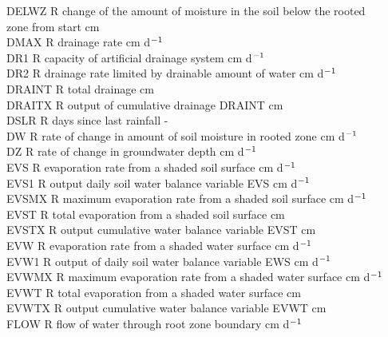 \documentclass[11pt]{article}
\begin{document}
\begin{tabbing}
DELWZ\> \> R\> change of the amount of moisture in the soil below the rooted \\
\>\> \> zone from start\> \> \> \> \> \> \> cm\\
DMAX\> \> R\> drainage rate\> \> \> \> \> \> \> cm d$^{{\rm -1}}$\\
DR1\> \> R\> capacity of artificial drainage system\> \> \> \> \> \> \> cm d$^{{\rm -1}}$\\
DR2\> \> R\> drainage rate limited by drainable amount of water\> \> \> \> \> \> \> cm d$^{{\rm -1}}$\\
DRAINT\> \> R\> total drainage\> \> \> \> \> \> \> cm\\
DRAITX\> \> R\> output of cumulative drainage DRAINT\> \> \> \> \> \> \> cm\\
DSLR\> \> R\> days since last rainfall\> \> \> \> \> \> \> -\\
DW\> \> R\> rate of change in amount of soil moisture in rooted zone\> \> \> \> \> \> \> cm d$^{{\rm -1}}$\\
DZ\> \> R\> rate of change in groundwater depth\> \> \> \> \> \> \> cm d$^{{\rm -1}}$\\
EVS\> \> R\> evaporation rate from a shaded soil surface\> \> \> \> \> \> \> cm d$^{{\rm -1}}$\\
EVS1\> \> R\> output daily soil water balance variable EVS\> \> \> \> \> \> \> cm d$^{{\rm -1}}$\\
EVSMX\> \> R\> maximum evaporation rate from a shaded soil surface\> \> \> \> \> \> \> cm d$^{{\rm -1}}$\\
EVST\> \> R\> total evaporation from a shaded soil surface\> \> \> \> \> \> \> cm\\
EVSTX\> \> R\> output cumulative water balance variable EVST\> \> \> \> \> \> \> cm\\
EVW\> \> R\> evaporation rate from a shaded water surface\> \> \> \> \> \> \> cm d$^{{\rm -1}}$\\
EVW1\> \> R\> output of daily soil water balance variable EWS\> \> \> \> \> \> \> cm d$^{{\rm -1}}$\\
EVWMX\> \> R\> maximum evaporation rate from a shaded water surface\> \> \> \> \> \> \> cm d$^{{\rm -1}}$\\
EVWT\> \> R\> total evaporation from a shaded water surface\> \> \> \> \> \> \> cm\\
EVWTX\> \> R\> output cumulative water balance variable EVWT\> \> \> \> \> \> \> cm\\
FLOW\> \> R\> flow of water through root zone boundary\> \> \> \> \> \> \> cm d$^{{\rm -1}}$\\

\end{tabbing}
\end{document}
